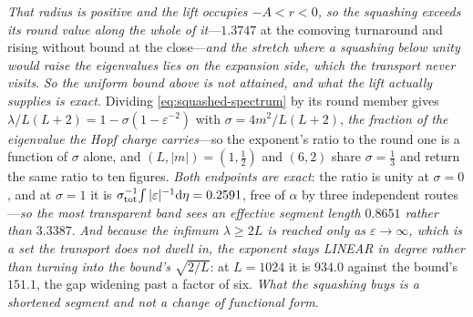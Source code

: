 \documentclass[11pt,a4paper]{article}
\theoremstyle{plain}
\theoremstyle{definition}
\theoremstyle{remark}
\newcommand{\dd}{\mathrm{d}}   %
\begin{document}
\emph{That radius is positive and the lift occupies $-A<r<0$, so the squashing exceeds its round value along the whole of it}---$1.3747$ at the comoving turnaround and rising without bound at the close---\emph{and the stretch where a squashing below unity would raise the eigenvalues lies on the expansion side, which the transport never visits}. \emph{So the uniform bound above is not attained, and what the lift actually supplies is exact.} Dividing \eqref{eq:squashed-spectrum} by its round member gives $\lambda/L(L+2)=1-\sigma(1-\varepsilon^{-2})$ with $\sigma=4m^2/L(L+2)$, \emph{the fraction of the eigenvalue the Hopf charge carries}---so the exponent's ratio to the round one is a function of $\sigma$ alone, and $(L,|m|)=(1,\tfrac12)$ and $(6,2)$ share $\sigma=\tfrac13$ and return the same ratio to ten figures. \emph{Both endpoints are exact}: the ratio is unity at $\sigma=0$, and at $\sigma=1$ it is $\sigma_{\rm tot}^{-1}\!\int|\varepsilon|^{-1}\dd\eta=0.2591$, free of $\alpha$ by three independent routes---\emph{so the most transparent band sees an effective segment length $0.8651$ rather than $3.3387$}. \emph{And because the infimum $\lambda\ge2L$ is reached only as $\varepsilon\to\infty$, which is a set the transport does not dwell in, the exponent stays LINEAR in degree rather than turning into the bound's $\sqrt{2/L}$}: at $L=1024$ it is $934.0$ against the bound's $151.1$, the gap widening past a factor of six. \emph{What the squashing buys is a shortened segment and not a change of functional form}.
\end{document}
